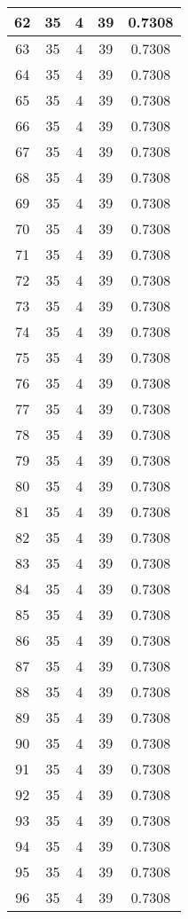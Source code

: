 \documentclass[letterpaper, 12pt]{article}
\begin{document}
\begin{longtable}{|c|c|c|c|c|}
\hline
62 & 35 & 4 & 39 & 0.7308 \\
\hline
63 & 35 & 4 & 39 & 0.7308 \\
\hline
64 & 35 & 4 & 39 & 0.7308 \\
\hline
65 & 35 & 4 & 39 & 0.7308 \\
\hline
66 & 35 & 4 & 39 & 0.7308 \\
\hline
67 & 35 & 4 & 39 & 0.7308 \\
\hline
68 & 35 & 4 & 39 & 0.7308 \\
\hline
69 & 35 & 4 & 39 & 0.7308 \\
\hline
70 & 35 & 4 & 39 & 0.7308 \\
\hline
71 & 35 & 4 & 39 & 0.7308 \\
\hline
72 & 35 & 4 & 39 & 0.7308 \\
\hline
73 & 35 & 4 & 39 & 0.7308 \\
\hline
74 & 35 & 4 & 39 & 0.7308 \\
\hline
75 & 35 & 4 & 39 & 0.7308 \\
\hline
76 & 35 & 4 & 39 & 0.7308 \\
\hline
77 & 35 & 4 & 39 & 0.7308 \\
\hline
78 & 35 & 4 & 39 & 0.7308 \\
\hline
79 & 35 & 4 & 39 & 0.7308 \\
\hline
80 & 35 & 4 & 39 & 0.7308 \\
\hline
81 & 35 & 4 & 39 & 0.7308 \\
\hline
82 & 35 & 4 & 39 & 0.7308 \\
\hline
83 & 35 & 4 & 39 & 0.7308 \\
\hline
84 & 35 & 4 & 39 & 0.7308 \\
\hline
85 & 35 & 4 & 39 & 0.7308 \\
\hline
86 & 35 & 4 & 39 & 0.7308 \\
\hline
87 & 35 & 4 & 39 & 0.7308 \\
\hline
88 & 35 & 4 & 39 & 0.7308 \\
\hline
89 & 35 & 4 & 39 & 0.7308 \\
\hline
90 & 35 & 4 & 39 & 0.7308 \\
\hline
91 & 35 & 4 & 39 & 0.7308 \\
\hline
92 & 35 & 4 & 39 & 0.7308 \\
\hline
93 & 35 & 4 & 39 & 0.7308 \\
\hline
94 & 35 & 4 & 39 & 0.7308 \\
\hline
95 & 35 & 4 & 39 & 0.7308 \\
\hline
96 & 35 & 4 & 39 & 0.7308 \\

\end{longtable}
\end{document}
